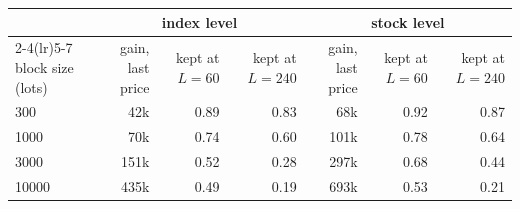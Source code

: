 \begin{tabular}{lrrrrrr}
\toprule
& \multicolumn{3}{c}{index level} & \multicolumn{3}{c}{stock level} \\
\cmidrule(lr){2-4}\cmidrule(lr){5-7}
block size (lots) & gain, last price & kept at $L=60$ & kept at $L=240$ & gain, last price & kept at $L=60$ & kept at $L=240$ \\
\midrule
300 & 42k & 0.89 & 0.83 & 68k & 0.92 & 0.87 \\
1000 & 70k & 0.74 & 0.60 & 101k & 0.78 & 0.64 \\
3000 & 151k & 0.52 & 0.28 & 297k & 0.68 & 0.44 \\
10000 & 435k & 0.49 & 0.19 & 693k & 0.53 & 0.21 \\
\bottomrule
\end{tabular}
